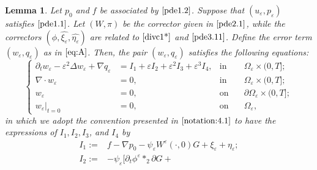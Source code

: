 \documentclass[13pt,CJK]{article}
\theoremstyle{plain}                       %
\newtheorem{lemma}{Lemma}[section]
\theoremstyle{remark}
\numberwithin{equation}{section}
\begin{document}
\begin{lemma}\label{lemma:4.3}
Let $p_0$ and $f$ be associated by $\eqref{pde1.2}$.
Suppose that $(u_\varepsilon,p_\varepsilon)$ satisfies $\eqref{pde1.1}$.
Let $(W,\pi)$ be the corrector given in
$\eqref{pde2.1}$, while the correctors $(\phi,\hat{\xi_{\varepsilon}},\hat{\eta_{\varepsilon}})$
are related to $\eqref{divc1*}$ and $\eqref{pde3.11}$.
Define the error term $(w_{\varepsilon},q_{\varepsilon})$ as in $\eqref{eq:A}$.
Then, the pair $(w_{\varepsilon},q_{\varepsilon})$ satisfies the following equations:
\begin{equation}\label{pde3.13}
\left\{
\begin{aligned}
\partial_t w_{\varepsilon}
-\varepsilon^2\Delta w_{\varepsilon}+\nabla q_{\varepsilon}&=I_1+\varepsilon I_2+\varepsilon^2I_3+\varepsilon^3 I_4,&\text{in}&\quad\Omega_{\varepsilon}\times(0,T];\\
\nabla\cdot w_{\varepsilon}&=0,&\text{in}&\quad
\Omega_{\varepsilon}\times(0,T];\\
w_{\varepsilon}&=0,&\text{on}&\quad
\partial\Omega_{\varepsilon}\times(0,T];\\
w_{\varepsilon}|_{t=0}&=0,&\text{on}
&\quad\Omega_{\varepsilon},
\end{aligned}
\right.
\end{equation}
in which we adopt the convention presented in $\eqref{notation:4.1}$ to have
the expressions of $I_1,I_2,I_3$, and $I_4$ by
\begin{equation}\label{notation:5.2}
\begin{aligned}
I_1:=&f-\nabla p_0-\psi_{\varepsilon}W^{\varepsilon}(\cdot,0)G
+\xi_{\varepsilon}+\eta_{\varepsilon};\\
I_2:=&-\psi_{\varepsilon}
\bigg[
\partial_t\phi^{\varepsilon}\ast_2\partial G+

\end{aligned}
\end{equation}
\end{lemma}
\end{document}
